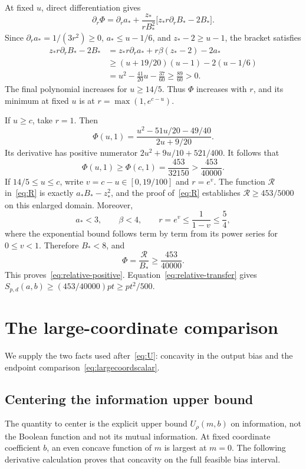 At fixed $u$, direct differentiation gives
\[
\partial_r\Phi=\partial_ra_*+
\frac{z_*}{rB_*^2}\bigl[z_*r\partial_rB_*-2B_*\bigr].
\]
Since $\partial_ra_*=1/(3r^2)\ge0$, $a_*\le u-1/6$, and $z_*-2\ge u-1$, the bracket satisfies
\begin{align*}
z_*r\partial_rB_*-2B_*
&=z_*r\partial_ra_*+r\beta(z_*-2)-2a_*\\
&\ge (u+19/20)(u-1)-2(u-1/6)\\
&=u^2-\frac{41}{20}u-\frac{37}{60}\ge\frac{89}{60}>0.
\end{align*}
The final polynomial increases for $u\ge14/5$. Thus $\Phi$ increases with $r$, and its minimum at fixed $u$ is at $r=\max(1,e^{c-u})$.

If $u\ge c$, take $r=1$. Then
\[
\Phi(u,1)=\frac{u^2-51u/20-49/40}{2u+9/20}.
\]
Its derivative has positive numerator $2u^2+9u/10+521/400$. It follows that
\[
\Phi(u,1)\ge\Phi(c,1)=\frac{453}{32150}>\frac{453}{40000}.
\]
If $14/5\le u\le c$, write $v=c-u\in[0,19/100]$ and $r=e^v$. The function $\mathcal R$ in~\eqref{eq:R} is exactly $a_*B_*-z_*^2$, and the proof of~\eqref{eq:R} establishes $\mathcal R\ge453/5000$ on this enlarged domain. Moreover,
\[
a_*<3,\qquad \beta<4,\qquad
r=e^v\le\frac1{1-v}\le\frac54,
\]
where the exponential bound follows term by term from its power series for $0\le v<1$. Therefore $B_*<8$, and
\[
\Phi=\frac{\mathcal R}{B_*}\ge\frac{453}{40000}.
\]
This proves~\eqref{eq:relative-positive}. Equation~\eqref{eq:relative-transfer} gives
$S_{p,d}(a,b)\ge(453/40000)pt\ge pt^2/500$.


\section{The large-coordinate comparison}\label{app:local}
We supply the two facts used after~\eqref{eq:U}: concavity in the output bias and the endpoint comparison~\eqref{eq:largecoordscalar}.

\subsection{Centering the information upper bound}
The quantity to center is the explicit upper bound $U_\rho(m,b)$ on information, not the Boolean function and not its mutual information. At fixed coordinate coefficient $b$, an even concave function of $m$ is largest at $m=0$. The following derivative calculation proves that concavity on the full feasible bias interval.

